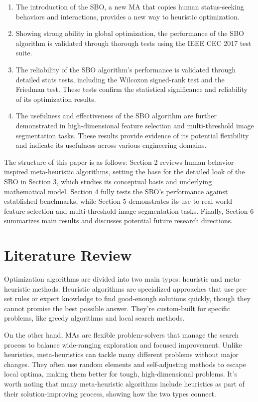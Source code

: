 \documentclass{article} %
\begin{document}
\begin{enumerate}
\item  The introduction of the SBO, a new MA that copies human status-seeking behaviors and interactions, provides a new way to heuristic optimization.

\item  Showing strong ability in global optimization, the performance of the SBO algorithm is validated through thorough tests using the IEEE CEC 2017 test suite.

\item  The reliability of the SBO algorithm's performance is validated through detailed stats tests, including the Wilcoxon signed-rank test and the Friedman test. These tests confirm the statistical significance and reliability of its optimization results.

\item  The usefulness and effectiveness of the SBO algorithm are further demonstrated in high-dimensional feature selection and multi-threshold image segmentation tasks. These results provide evidence of its potential flexibility and indicate its usefulness across various engineering domains.
\end{enumerate}

The structure of this paper is as follows: Section 2 reviews human behavior-inspired meta-heuristic algorithms, setting the base for the detailed look of the SBO in Section 3, which studies its conceptual basis and underlying mathematical model. Section 4 fully tests the SBO's performance against established benchmarks, while Section 5 demonstrates its use to real-world feature selection and multi-threshold image segmentation tasks. Finally, Section 6 summarizes main results and discusses potential future research directions.


\section{ Literature Review}

Optimization algorithms are divided into two main types: heuristic and meta-heuristic methods. Heuristic algorithms are specialized approaches that use pre-set rules or expert knowledge to find good-enough solutions quickly, though they cannot promise the best possible answer. They're custom-built for specific problems, like greedy algorithms and local search methods.

On the other hand, MAs are flexible problem-solvers that manage the search process to balance wide-ranging exploration and focused improvement. Unlike heuristics, meta-heuristics can tackle many different problems without major changes. They often use random elements and self-adjusting methods to escape local optima, making them better for tough, high-dimensional problems. It's worth noting that many meta-heuristic algorithms include heuristics as part of their solution-improving process, showing how the two types connect.
\end{document}
